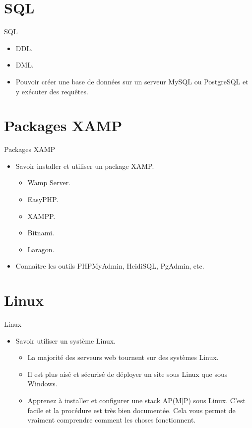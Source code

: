 \documentclass{beamer}
\begin{document}
\section{SQL}
\begin{frame}{SQL}
\begin{center}
\begin{itemize}
  \item DDL.
  \item DML.
  \item Pouvoir créer une base de données sur un serveur MySQL ou PostgreSQL et y exécuter des requêtes.
\end{itemize}
\end{center}
\end{frame}

\section{Packages XAMP}
\begin{frame}{Packages XAMP}
\begin{itemize}
  \item Savoir installer et utiliser un package XAMP.
    \begin{itemize}
      \item Wamp Server.
      \item EasyPHP.
      \item XAMPP.
      \item Bitnami.
      \item Laragon.
    \end{itemize}
  \item Connaître les outils PHPMyAdmin, HeidiSQL, PgAdmin, etc.
\end{itemize}
\end{frame}

\section{Linux}
\begin{frame}{Linux}
  \begin{itemize}
    \item Savoir utiliser un système Linux.
    \begin{itemize}
      \item La majorité des serveurs web tournent sur des systèmes Linux.
      \item Il est plus aisé et sécurisé de déployer un site sous Linux que sous Windows.
      \item Apprenez à installer et configurer une stack AP(M|P) sous Linux. C'est facile et la procédure est très bien documentée. Cela vous permet de vraiment comprendre comment les choses fonctionnent.
    \end{itemize}
  \end{itemize}
\end{frame}
\end{document}
